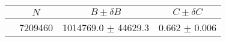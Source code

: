 \begin{tabular}{lccc}
\hline
    &   $N$   & $B \pm \delta B$  &  $C \pm \delta C$ \\
\hline
                               & 7209460    & 1014769.0  $\pm$ 44629.3 & 0.662      $\pm$ 0.006 \\
\hline
\end{tabular}
